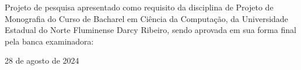 \begin{folhadeaprovacao}


\begin{center}
    {\ABNTEXchapterfont\large\imprimirautor}

    \vspace*{\fill}\vspace*{\fill}
    \begin{center}
      \ABNTEXchapterfont\bfseries\Large\imprimirtitulo
    \end{center}
    \vspace*{\fill}

\end{center}

Projeto de pesquisa apresentado como requisito da disciplina de Projeto de Monografia do Curso de Bacharel em Ciência da Computação, da Universidade Estadual do Norte Fluminense Darcy Ribeiro, sendo aprovada em sua forma final pela banca examinadora:

    \vspace{1.5cm}
    \vspace{3 cm}%

    \begin{center}
    \vspace*{0.5cm}
    {\large\imprimirlocal}
    \par
    {\large28 de agosto de 2024}
    \vspace*{1cm}
  \end{center}
  
\end{folhadeaprovacao}